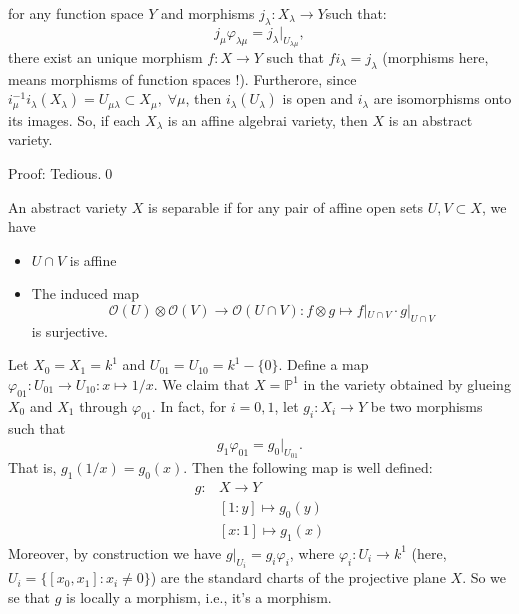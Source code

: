 \begin{dang}
\begin{theorem}
for any function space $Y$ and morphisms $j_\lambda: X_\lambda\to Y$such that:
\begin{equation}
    j_\mu \varphi_{\lambda\mu} = j_\lambda|_{U_{\lambda\mu}},
\end{equation}
there exist an unique morphism $f: X\to Y$ such that 
$fi_\lambda = j_\lambda$ (morphisms here, means morphisms of function spaces !). Furtherore, since 
$i_\mu^{-1}i_\lambda(X_\lambda)=U_{\mu\lambda}\subset X_\mu,\;\forall\mu$, then $i_\lambda(U_\lambda)$ is open and 
$i_\lambda$ are isomorphisms onto its images. So, if each $X_\lambda$ is an affine algebrai variety, then 
$X$ is an abstract variety.
    \end{theorem}
\end{dang}
Proof: Tedious.\qed

\begin{dang}
    \begin{definition}
        An abstract variety $X$ is separable if for any pair of affine open sets $U,V\subset X$, we have 
        \begin{itemize}
            \item[(1)] $U\cap V$ is affine
            \item[(2)] The induced map 
            \begin{equation}
                \mathcal{O}(U)\otimes\mathcal{O}(V)\rightarrow \mathcal{O}(U\cap V): f\otimes g\mapsto f|_{U\cap V}\cdot 
                g|_{U\cap V}
            \end{equation}
            is surjective.
        \end{itemize}
    \end{definition}
\end{dang}


\begin{example}
    Let $X_0= X_1 = k^1$ and $U_{01}=U_{10}=k^1-\{0\}$. Define a map $\varphi_{01}:U_{01}\to U_{10}:x\mapsto 1/x$. 
    We claim that $X = \mathbb{P}^1$ in the variety obtained by glueing $X_0$ and $X_1$ through $\varphi_{01}$. 
    In fact, for $i=0,1$, let $g_i: X_i\to Y$ be two morphisms such that 
    \begin{equation}
        g_1\varphi_{01}=g_0\big|_{U_{01}}.
    \end{equation}
    That is, $g_1(1/x)=g_0(x)$. Then the following map is well defined:
    \begin{equation}
        \begin{split}
             g:&X\to Y\\
             &[1:y]\mapsto g_0(y)\\
             &[x:1]\mapsto g_1(x)
        \end{split}
    \end{equation}
    Moreover, by construction we have $g|_{U_i}=g_i\varphi_i$, where $\varphi_i: U_i\to k^1$ 
    (here, $U_i=\{[x_0,x_1]:x_i\neq0\}$) are the standard charts of 
    the projective plane $X$. So we se that $g$ is locally a morphism, i.e., it's a morphism.
\end{example}

